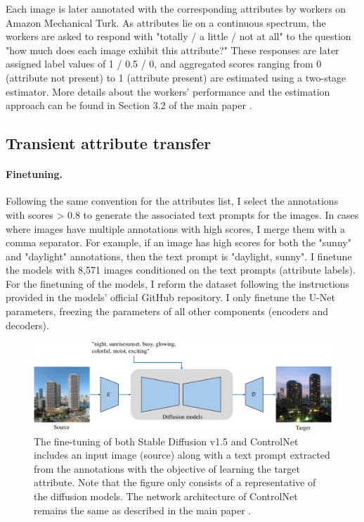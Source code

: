 Each image is later annotated with the corresponding attributes by workers on Amazon Mechanical Turk. As attributes lie on a continuous spectrum, the workers are asked to respond with "totally / a little / not at all" to the question "how much does each image exhibit this attribute?" These responses are later assigned label values of 1 / 0.5 / 0, and aggregated scores ranging from 0 (attribute not present) to 1 (attribute present) are estimated using a two-stage estimator. More details about the workers' performance and the estimation approach can be found in Section 3.2 of the main paper \cite{laffont2014transient}.

\subsection{Transient attribute transfer}

\paragraph{Finetuning.} Following the same convention for the attributes list, I select the annotations with scores > 0.8 to generate the associated text prompts for the images. In cases where images have multiple annotations with high scores, I merge them with a comma separator. For example, if an image has high scores for both the "sunny" and "daylight" annotations, then the text prompt is "daylight, sunny". I finetune the models with 8,571 images conditioned on the text prompts (attribute labels). For the finetuning of the models, I reform the dataset following the instructions provided in the models' official GitHub repository. I only finetune the U-Net parameters, freezing the parameters of all other components (encoders and decoders).

\begin{figure}[ht]
  \includegraphics[width=\textwidth]{Chapters/zero-shot-tat-figs/TAT-overview.pdf}
  \caption{The fine-tuning of both Stable Diffusion v1.5 and ControlNet includes an input image (source) along with a text prompt extracted from the annotations with the objective of learning the target attribute. Note that the figure only consists of a representative of the diffusion models. The network architecture of ControlNet remains the same as described in the main paper \cite{zhang2023adding}.}
  \label{fig:ddim-inversion}
\end{figure}


